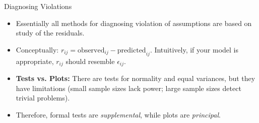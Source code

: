 \begin{frame}{Diagnosing Violations}
  \begin{itemize}
    \item Essentially all methods for diagnosing violation of assumptions are based on study of the \alert{residuals}.
    \item Conceptually: $r_{ij} = \text{observed}_{ij} - \text{predicted}_{ij}$.
    Intuitively, if your model is appropriate, $r_{ij}$ should resemble $\epsilon_{ij}$.
    \item \textbf{Tests vs. Plots:} There are tests for normality and equal variances, but they have limitations (small sample sizes lack power; large sample sizes detect trivial problems).
    \item Therefore, formal tests are \textit{supplemental}, while plots are \textit{principal}.
  \end{itemize}

\end{frame}

